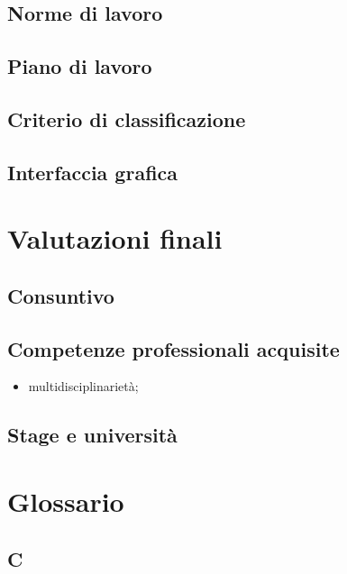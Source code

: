 \documentclass[12pt,a4paper,headsepline,hidelinks]{scrreprt} %
\begin{document}
	\section{Norme di lavoro}

	\section{Piano di lavoro}

	\section{Criterio di classificazione}


	\section{Interfaccia grafica}	

	\chapter{Valutazioni finali}

	\section{Consuntivo}

	\section{Competenze professionali acquisite}
	\begin{itemize}
	\item multidisciplinarietà;
	\end{itemize}

	\section{Stage e università}

	\appendix
	\chapter[Glossario]{Glossario}
	\section*{C}
\end{document}
